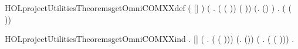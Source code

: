 \newcommand{\HOLprojectUtilitiesDate}{27 December 2018}
\newcommand{\HOLprojectUtilitiesTime}{11:17}
\begin{SaveVerbatim}{HOLprojectUtilitiesTheoremsgetOmniCOMXXdef}
\HOLTokenTurnstile{} ( [] \HOLSymConst{=} ) \HOLSymConst{\HOLTokenConj{}}
   (\HOLSymConst{\HOLTokenForall{}} .
       ( ( )\HOLSymConst{::}) \HOLSymConst{=}
       ( )) \HOLSymConst{\HOLTokenConj{}}
   (\HOLSymConst{\HOLTokenForall{}}.  (\HOLSymConst{::}) \HOLSymConst{=}  ) \HOLSymConst{\HOLTokenConj{}}
   \HOLSymConst{\HOLTokenForall{}} .
      ( ( )\HOLSymConst{::}) \HOLSymConst{=}  
\end{SaveVerbatim}
\newcommand{\HOLprojectUtilitiesTheoremsgetOmniCOMXXdef}{\UseVerbatim{HOLprojectUtilitiesTheoremsgetOmniCOMXXdef}}
\begin{SaveVerbatim}{HOLprojectUtilitiesTheoremsgetOmniCOMXXind}
\HOLTokenTurnstile{} \HOLSymConst{\HOLTokenForall{}}.
      [] \HOLSymConst{\HOLTokenConj{}} (\HOLSymConst{\HOLTokenForall{}} .  ( ( )\HOLSymConst{::})) \HOLSymConst{\HOLTokenConj{}}
     (\HOLSymConst{\HOLTokenForall{}}.   \HOLSymConst{\HOLTokenImp{}}  (\HOLSymConst{::})) \HOLSymConst{\HOLTokenConj{}}
     (\HOLSymConst{\HOLTokenForall{}} .   \HOLSymConst{\HOLTokenImp{}}  ( ( )\HOLSymConst{::})) \HOLSymConst{\HOLTokenImp{}}
     \HOLSymConst{\HOLTokenForall{}}.  
\end{SaveVerbatim}
\newcommand{\HOLprojectUtilitiesTheoremsgetOmniCOMXXind}{\UseVerbatim{HOLprojectUtilitiesTheoremsgetOmniCOMXXind}}
